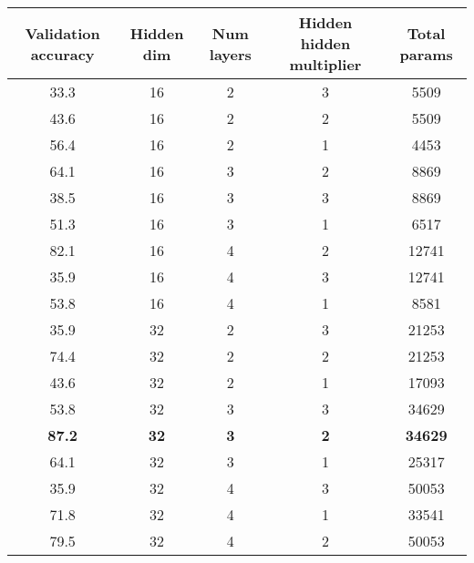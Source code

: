 \documentclass{article}
\begin{document}
\begin{table*}[t]
    \scriptsize
    \begin{center}
        \begin{tabular}{ccccc}
        \toprule
        \textbf{Validation accuracy} & \textbf{Hidden dim} & \textbf{Num layers} & \textbf{Hidden hidden multiplier} & \textbf{Total params} \\
        \midrule
        33.3 &         16 &                        2 &          3 &        5509 \\
        43.6 &         16 &                        2 &          2 &        5509 \\
        56.4 &         16 &                        2 &          1 &        4453 \\
        64.1 &         16 &                        3 &          2 &        8869 \\
        38.5 &         16 &                        3 &          3 &        8869 \\
        51.3 &         16 &                        3 &          1 &        6517 \\
        82.1 &         16 &                        4 &          2 &       12741 \\
        35.9 &         16 &                        4 &          3 &       12741 \\
        53.8 &         16 &                        4 &          1 &        8581 \\
        35.9 &         32 &                        2 &          3 &       21253 \\
        74.4 &         32 &                        2 &          2 &       21253 \\
        43.6 &         32 &                        2 &          1 &       17093 \\
        53.8 &         32 &                        3 &          3 &       34629 \\
        \textbf{87.2} &         \textbf{32} & \textbf{3} & \textbf{2} & \textbf{34629} \\
        64.1 &         32 &                        3 &          1 &       25317 \\
        35.9 &         32 &                        4 &          3 &       50053 \\
        71.8 &         32 &                        4 &          1 &       33541 \\
        79.5 &         32 &                        4 &          2 &       50053 \\

\end{tabular}
\end{center}
\end{table*}
\end{document}
